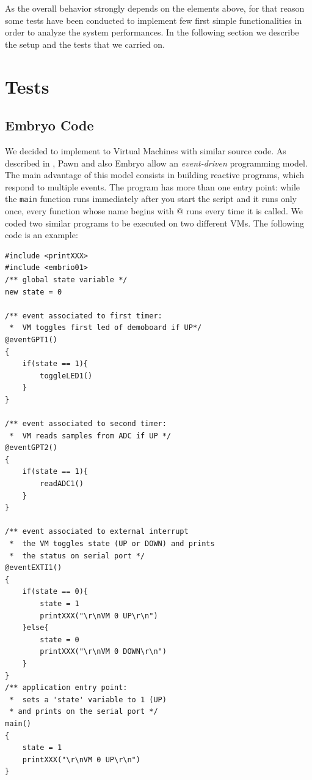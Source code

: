 \documentclass[a4paper,10pt]{article}
\begin{document}
\begin{multicols}{2}
As the overall behavior strongly depends on the elements above, for that reason some tests have been conducted to implement few first simple functionalities in order to analyze the system performances. In the following section we describe the setup and the tests that we carried on.


\section{Tests}

\subsection{Embryo Code}

We decided to implement to Virtual Machines with similar source code. As described in \cite{pawnGuide}, Pawn and also Embryo allow an \textit{event-driven} programming model. The main advantage of this model consists in building reactive programs, which respond to multiple events. The program has more than one entry point: while the \texttt{main} function runs immediately after you start the script and it runs only once, every function whose name begins with @ runs every time it is called. We coded two similar programs to be executed on two different VMs. The following code is an example:
\bigskip
\begin{lstlisting}[caption={EmbrIO first VM}]
#include <printXXX>
#include <embrio01>
/** global state variable */
new state = 0

/** event associated to first timer:
 *  VM toggles first led of demoboard if UP*/
@eventGPT1()
{
	if(state == 1){
		toggleLED1()
	}
}

/** event associated to second timer:
 *  VM reads samples from ADC if UP */
@eventGPT2()
{
	if(state == 1){
		readADC1()
	}
}

/** event associated to external interrupt
 *  the VM toggles state (UP or DOWN) and prints
 *  the status on serial port */
@eventEXTI1()
{
	if(state == 0){
		state = 1
		printXXX("\r\nVM 0 UP\r\n")
	}else{
		state = 0
		printXXX("\r\nVM 0 DOWN\r\n")
	}
}
/** application entry point:
 *  sets a 'state' variable to 1 (UP)
 * and prints on the serial port */
main()
{
	state = 1
    printXXX("\r\nVM 0 UP\r\n")
}
\end{lstlisting}


\end{multicols}
\end{document}
